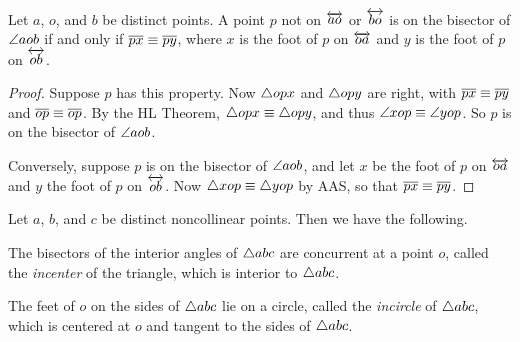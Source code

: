 \begin{prop}\label{prop:bisector-foot}
Let \(a\), \(o\), and \(b\) be distinct points.
A point \(p\) not on \(\overleftrightarrow{ao}\) or \(\overleftrightarrow{bo}\) is on the bisector of \(\angle{aob}\) if and only if \(\overline{px} \equiv \overline{py}\), where \(x\) is the foot of \(p\) on \(\overleftrightarrow{oa}\) and \(y\) is the foot of \(p\) on \(\overleftrightarrow{ob}\).
\end{prop}

\begin{proof}
Suppose \(p\) has this property.
Now \(\bigtriangleup{opx}\) and \(\bigtriangleup{opy}\) are right, with \(\overline{px} \equiv \overline{py}\) and \(\overline{op} \equiv \overline{op}\).
By the HL Theorem, \(\bigtriangleup{opx} \equiv \bigtriangleup{opy}\), and thus \(\angle{xop} \equiv \angle{yop}\).
So \(p\) is on the bisector of \(\angle{aob}\).

Conversely, suppose \(p\) is on the bisector of \(\angle{aob}\), and let \(x\) be the foot of \(p\) on \(\overleftrightarrow{oa}\) and \(y\) the foot of \(p\) on \(\overleftrightarrow{ob}\).
Now \(\bigtriangleup{xop} \equiv \bigtriangleup{yop}\) by AAS, so that \(\overline{px} \equiv \overline{py}\).
\end{proof}

\begin{construct}
Let \(a\), \(b\), and \(c\) be distinct noncollinear points.
Then we have the following.
\begin{proplist}
\item The bisectors of the interior angles of \(\bigtriangleup{abc}\) are concurrent at a point \(o\), called the \emph{incenter} of the triangle, which is interior to \(\bigtriangleup{abc}\).

\item The feet of \(o\) on the sides of \(\bigtriangleup{abc}\) lie on a circle, called the \emph{incircle} of \(\bigtriangleup{abc}\), which is centered at \(o\) and tangent to the sides of \(\bigtriangleup{abc}\).
\end{proplist}
\end{construct}

